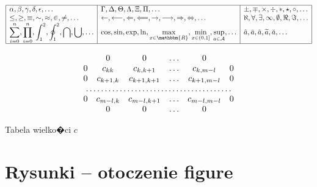 \documentclass[11pt,wide]{mwart}
\begin{document}
%
%
\renewcommand{\arraystretch}{2}

$$
\begin{array}{*{3}{|l}|}\hline
\displaystyle
\alpha, \beta, \gamma, \delta, \epsilon, \ldots &
\displaystyle
\Gamma, \Delta, \Theta, \Lambda, \Xi, \Pi, \ldots &
\displaystyle
\pm, \mp, \times, \div, \ast, \star, \circ, \ldots\\
\displaystyle
\leq, \geq, \equiv, \sim, \approx, \in, \neq, \ldots &
\displaystyle
\leftarrow, \longleftarrow, \Leftarrow, \Longleftarrow,
\rightarrow, \longrightarrow, \Rightarrow, \Leftrightarrow, \ldots &
\displaystyle
\aleph, \forall, \exists, \infty, \emptyset, \Re, \Im,\ldots\\
\displaystyle
\sum_{i=0}^{n}, \prod_{i=0}^{n}, \int_{1}^{2}, \oint_{1}^{2}, \bigcap,
\bigcup,\ldots &
\displaystyle
\cos, \sin, \exp, \ln, \max_{x\in\mathbbm{R}}, \min_{x\in(0,1]},
\sup_{a\in\cal A}, \ldots &
\displaystyle
\hat{a}, \bar{a}, \tilde{a}, \widetilde{a}, \breve{a}, \ldots\\
\hline
\end{array}
$$

\renewcommand{\arraystretch}{1}

\begin{table}[h]
\[
\begin{array}{cccccc}
    &0&0&\ldots&0& \\
    0& c_{kk}&c_{k,k+1}&\ldots&c_{k,m-l}&0     \\
    0& c_{k+1,k}&c_{k+1,k+1}&\ldots&c_{k+1,m-l}&0  \\
    \multicolumn{6}{c}{\dotfill}\\    0& c_{m-l,k}&c_{m-l,k+1}&\ldots&c_{m-l,m-l}&0  \\
     &0&0&\ldots&0&
\end{array}
\]	
\caption{Tabela wielko�ci $c$ \label{Tab:C}}
\end{table}


\newpage

\section{Rysunki -- otoczenie figure}
\end{document}
